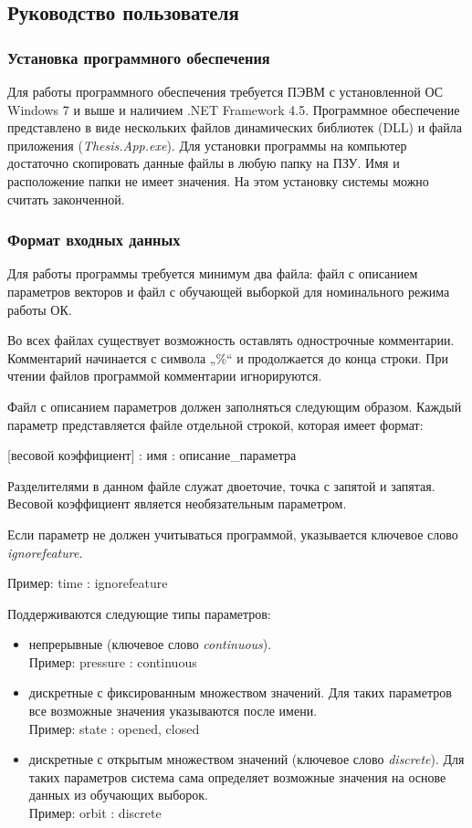 \subsection{Руководство пользователя}
\subsubsection{Установка программного обеспечения}
Для работы программного обеспечения требуется ПЭВМ с установленной ОС Windows 7 и выше и наличием .NET Framework 4.5. Программное обеспечение представлено в виде нескольких файлов динамических библиотек (DLL) и файла приложения (\textit{Thesis.App.exe}). Для установки программы на компьютер достаточно скопировать данные файлы в любую папку на ПЗУ. Имя и расположение папки не имеет значения. На этом установку системы можно считать законченной.

\subsubsection{Формат входных данных}
Для работы программы требуется минимум два файла: файл с описанием параметров векторов и файл с обучающей выборкой для номинального режима работы ОК.

Во всех файлах существует возможность оставлять однострочные комментарии. Комментарий начинается с символа „\%“ и продолжается до конца строки. При чтении файлов программой комментарии игнорируются.

Файл с описанием параметров должен заполняться следующим образом. Каждый параметр представляется файле отдельной строкой, которая имеет формат:

\textsf{[весовой коэффициент] : имя : описание\_параметра}

Разделителями в данном файле служат двоеточие, точка с запятой и запятая. Весовой коэффициент является необязательным параметром.

Если параметр не должен учитываться программой, указывается ключевое слово \textit{ignorefeature}.

Пример: \textsf{time : ignorefeature}

Поддерживаются следующие типы параметров:
\begin{itemize}
	\item непрерывные (ключевое слово \textit{continuous}). \\ Пример: \textsf{pressure : continuous}
	\item дискретные с фиксированным множеством значений. Для таких параметров все возможные значения указываются после имени. \\ Пример: \textsf{state : opened, closed}
	\item дискретные с открытым множеством значений (ключевое слово \textit{discrete}). Для таких параметров система сама определяет возможные значения на основе данных из обучающих выборок. \\ Пример: \textsf{orbit : discrete}
\end{itemize}

